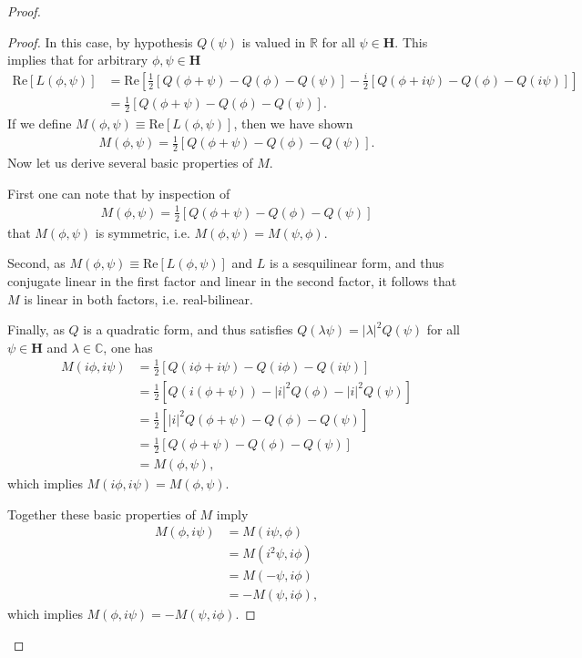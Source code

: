 \begin{proof}
\begin{proof}
In this case, by hypothesis $Q(\psi)$ is valued in $\mathbb{R}$ for all $\psi \in \mathbf{H}$. This implies that for arbitrary $\phi, \psi \in \mathbf{H}$
\begin{align}
    \text{Re} \left[ L(\phi, \psi) \right]
        &= \text{Re} \left[ \frac{1}{2} \left[ Q(\phi + \psi) - Q(\phi) - Q(\psi) \right] -\frac{i}{2} \left[ Q(\phi + i\psi) - Q(\phi) - Q(i\psi) \right] \right] \\
        &= \frac{1}{2} \left[ Q(\phi + \psi) - Q(\phi) - Q(\psi) \right].
\end{align}
If we define $M(\phi, \psi) \equiv \text{Re} \left[ L(\phi, \psi) \right]$, then we have shown
\begin{align}
    M(\phi, \psi) = \frac{1}{2} \left[ Q(\phi + \psi) - Q(\phi) - Q(\psi) \right].
\end{align}
Now let us derive several basic properties of $M$.

First one can note that by inspection of
\begin{align}
    M(\phi, \psi) = \frac{1}{2} \left[ Q(\phi + \psi) - Q(\phi) - Q(\psi) \right]
\end{align}
that $M(\phi, \psi)$ is symmetric, i.e. $M(\phi, \psi) = M(\psi, \phi)$.

Second, as $M(\phi, \psi) \equiv \text{Re} \left[ L(\phi, \psi) \right]$ and $L$ is a sesquilinear form, and thus conjugate linear in the first factor and linear in the second factor, it follows that $M$ is linear in both factors, i.e. real-bilinear.

Finally, as $Q$ is a quadratic form, and thus satisfies $Q(\lambda\psi) = \lvert\lambda\rvert^2 Q(\psi)$ for all $\psi \in \mathbf{H}$ and $\lambda \in \mathbb{C}$, one has
\begin{align}
    M(i\phi, i\psi) &= \frac{1}{2} \left[ Q(i\phi + i\psi) - Q(i\phi) - Q(i\psi) \right] \\
                    &= \frac{1}{2} \left[ Q(i(\phi + \psi)) - \lvert i \rvert^2Q(\phi) - \lvert i \rvert^2Q(\psi) \right] \\
                    &= \frac{1}{2} \left[ \lvert i \rvert^2Q(\phi + \psi) - Q(\phi) - Q(\psi) \right] \\
                    &= \frac{1}{2} \left[ Q(\phi + \psi) - Q(\phi) - Q(\psi) \right] \\
                    &= M(\phi, \psi),
\end{align}
which implies $M(i\phi, i\psi) = M(\phi, \psi)$.

Together these basic properties of $M$ imply
\begin{align}
    M(\phi, i\psi) &= M(i\psi, \phi) \\
                   &= M(i^2\psi, i\phi) \\
                   &= M(-\psi, i\phi) \\
                   &= -M(\psi, i\phi),
\end{align}
which implies $M(\phi, i\psi) = -M(\psi, i\phi)$.


\end{proof}
\end{proof}
